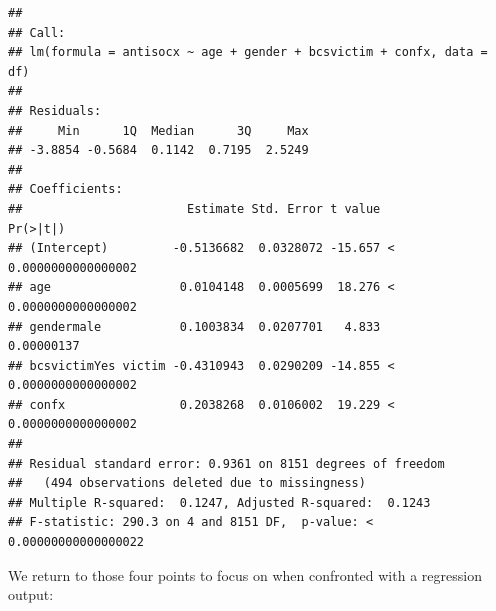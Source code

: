 \documentclass[
]{book}
\begin{document}
\begin{verbatim}
## 
## Call:
## lm(formula = antisocx ~ age + gender + bcsvictim + confx, data = df)
## 
## Residuals:
##     Min      1Q  Median      3Q     Max 
## -3.8854 -0.5684  0.1142  0.7195  2.5249 
## 
## Coefficients:
##                       Estimate Std. Error t value             Pr(>|t|)
## (Intercept)         -0.5136682  0.0328072 -15.657 < 0.0000000000000002
## age                  0.0104148  0.0005699  18.276 < 0.0000000000000002
## gendermale           0.1003834  0.0207701   4.833           0.00000137
## bcsvictimYes victim -0.4310943  0.0290209 -14.855 < 0.0000000000000002
## confx                0.2038268  0.0106002  19.229 < 0.0000000000000002
## 
## Residual standard error: 0.9361 on 8151 degrees of freedom
##   (494 observations deleted due to missingness)
## Multiple R-squared:  0.1247, Adjusted R-squared:  0.1243 
## F-statistic: 290.3 on 4 and 8151 DF,  p-value: < 0.00000000000000022
\end{verbatim}

We return to those four points to focus on when confronted with a regression output:
\end{document}
